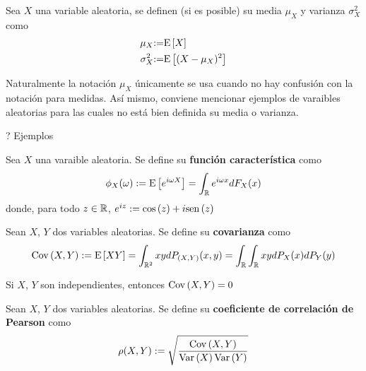 \begin{definicion}
Sea $X$ una variable aleatoria, se definen (si es posible) su media $\mu_X$ y varianza $\sigma_X^{2}$ como
\begin{align}
\mu_X &{:=} \mathrm{E}\left[ X \right] \\
\sigma_X^{2} &{:=} \mathrm{E}\left[ (X-\mu_X)^{2} \right]
\end{align}
\end{definicion}

Naturalmente la notación $\mu_X$ únicamente se usa cuando no hay confusión con la notación para medidas. Así mismo, conviene mencionar ejemplos de varaibles aleatorias para las cuales no está bien definida su media o varianza.

? Ejemplos


\begin{definicion}
Sea $X$ una varaible aleatoria. Se define su \textbf{función característica} como
\begin{equation}
\phi_X (\omega) := \mathrm{E}\left[ e^{i \omega X} \right] = \int_{\mathbb{R}} e^{i \omega x} dF_X(x)
\end{equation}
donde, para todo $z\in \mathbb{R}$, $e^{i z} := \mathrm{cos}\left( z \right) + i \mathrm{sen}\left( z \right)$
\end{definicion}

\begin{definicion}
Sean $X$, $Y$ dos variables aleatorias. Se define su \textbf{covarianza} como
\begin{equation}
\mathrm{Cov}\left( X,Y \right) := \mathrm{E}\left[ X Y \right] = \int_{\mathbb{R}^{2}} x y d P_{(X,Y)}(x,y) = \int_{\mathbb{R}} \int_{\mathbb{R}} x y dP_X(x) dP_Y(y)
\end{equation}
\end{definicion}

\begin{proposicion}
Si $X$, $Y$ son independientes, entonces $\mathrm{Cov}\left( X,Y \right) = 0$
\end{proposicion}

\begin{definicion}
Sean $X$, $Y$ dos variables aleatorias. Se define su \textbf{coeficiente de correlación de Pearson} como
\begin{equation}
\rho (X,Y) := \sqrt{\frac{\mathrm{Cov}\left( X,Y \right)}{\mathrm{Var}\left( X \right) \mathrm{Var}\left( Y \right)}}
\end{equation}
\end{definicion}

